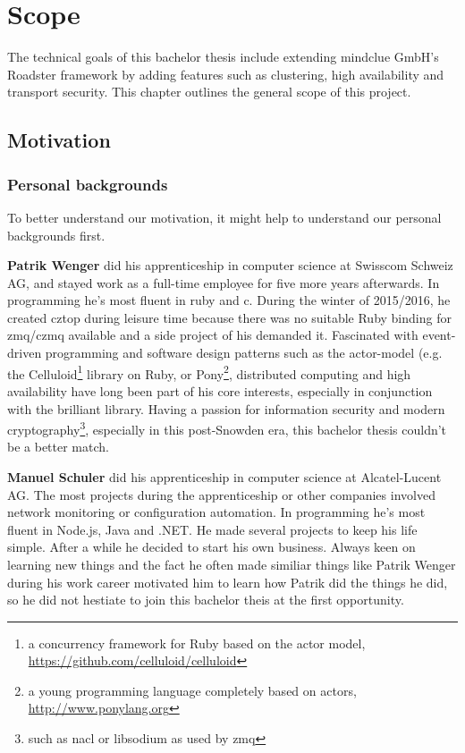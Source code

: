 \chapter{Scope}
The technical goals of this bachelor thesis include extending mindclue GmbH's
Roadster framework by adding features such as clustering, high availability and
transport security. This chapter outlines the general scope of this project.

\section{Motivation}
\subsection{Personal backgrounds}
To better understand our motivation, it might help to understand our personal
backgrounds first.

\textbf{Patrik Wenger} did his apprenticeship in computer science at Swisscom
Schweiz AG, and stayed work as a full-time employee for five more years
afterwards. In programming he's most fluent in \gls{ruby} and \gls{c}. During
the winter of 2015/2016, he created \gls{cztop} during leisure time because
there was no suitable Ruby binding for \gls{zmq}/\gls{czmq} available and a side
project of his demanded it. Fascinated with event-driven programming and
software design patterns such as the \gls{actor-model} (e.g. the
Celluloid\footnote{a concurrency framework for Ruby based on the actor model,
\url{https://github.com/celluloid/celluloid}} library on Ruby, or
Pony\footnote{a young programming language completely based on actors,
\url{http://www.ponylang.org}}, distributed computing and high availability
have long been part of his core interests, especially in conjunction with the
brilliant \zmq library. Having a passion for information security and modern
cryptography\footnote{such as \gls{nacl} or \gls{libsodium} as used by
\gls{zmq}}, especially in this post-Snowden era, this bachelor thesis couldn't
be a better match.

\textbf{Manuel Schuler} did his apprenticeship in computer science at Alcatel-Lucent AG.
The most projects during the apprenticeship or other companies involved network monitoring or
configuration automation. In programming he's most fluent in Node.js, Java and .NET. He
made several projects to keep his life simple. After a while he decided to start his own business.
Always keen on learning new things and the fact he often made similiar things like Patrik Wenger during his work
career motivated him to learn how Patrik did the things he did,
so he did not hestiate to join this bachelor theis at the first opportunity.

